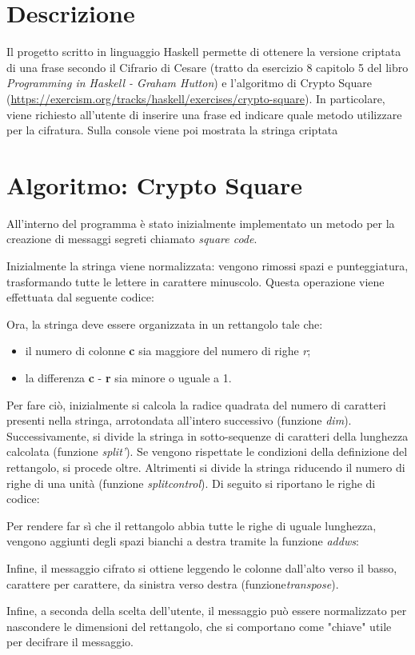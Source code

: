 \section{Descrizione}
Il progetto scritto in linguaggio Haskell permette di ottenere la versione criptata di una frase secondo il Cifrario di Cesare (tratto da esercizio 8 capitolo 5 del libro \textit{Programming in Haskell - Graham Hutton}) e l'algoritmo di Crypto Square (\url{https://exercism.org/tracks/haskell/exercises/crypto-square}). In particolare, viene richiesto all'utente di inserire una frase ed indicare quale metodo utilizzare per la cifratura. Sulla console viene poi mostrata la stringa criptata

\section{Algoritmo: Crypto Square}
All'interno del programma è stato inizialmente implementato un metodo per la creazione di messaggi segreti chiamato \textit{square code}. 

Inizialmente la stringa viene normalizzata: vengono rimossi spazi e punteggiatura, trasformando tutte le lettere in carattere minuscolo. Questa operazione viene effettuata dal seguente codice:

Ora, la stringa deve essere organizzata in un rettangolo tale che:
\begin{itemize}
	\item il numero di colonne \textbf{c} sia maggiore del numero di righe \textit{r};
	\item la differenza \textbf{c} - \textbf{r} sia minore o uguale a 1. 
\end{itemize}
Per fare ciò, inizialmente si calcola la radice quadrata del numero di caratteri presenti nella stringa, arrotondata all'intero successivo (funzione \textit{dim}). Successivamente, si divide la stringa in sotto-sequenze di caratteri della lunghezza calcolata (funzione \textit{split'}). Se vengono rispettate le condizioni della definizione del rettangolo, si procede oltre. Altrimenti si divide la stringa riducendo il numero di righe di una unità (funzione \textit{splitcontrol}). Di seguito si riportano le righe di codice:

Per rendere far sì che il rettangolo abbia tutte le righe di uguale lunghezza, vengono aggiunti degli spazi bianchi a destra tramite la funzione \textit{addws}:

Infine, il messaggio cifrato si ottiene leggendo le colonne dall'alto verso il basso, carattere per carattere, da sinistra verso destra (funzione\textit{transpose}).

Infine, a seconda della scelta dell'utente, il messaggio può essere normalizzato per nascondere le dimensioni del rettangolo, che si comportano come "chiave" utile per decifrare il messaggio.

